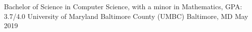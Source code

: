 
\begin{cventries}
  \cventry
    {Bachelor of Science in Computer Science, with a minor in Mathematics, GPA: 3.7/4.0} %
    {University of Maryland Baltimore County (UMBC)} %
    {Baltimore, MD} %
    {May 2019} %
    {} %
\end{cventries}
